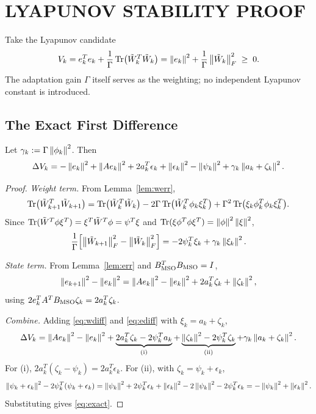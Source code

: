 \section{LYAPUNOV STABILITY PROOF}
\label{sec:proof}

Take the Lyapunov candidate
\begin{equation}\label{eq:V}
V_k=e_k^Te_k+\frac{1}{\Gamma}\operatorname{Tr}\bigl(\tilde{W}_k^T\tilde{W}_k\bigr)
   =\left\lVert e_k \right\rVert^2+\frac{1}{\Gamma}\left\lVert \tilde{W}_k \right\rVert_F^2\;\ge\;0 .
\end{equation}
The adaptation gain $\Gamma$ itself serves as the weighting; no independent
Lyapunov constant is introduced.

\subsection{The Exact First Difference}

\begin{proposition}\label{prop:exact}
Let $\gamma_k:=\Gamma\left\lVert \phi_k \right\rVert^2$. Then
\begin{equation}\label{eq:exact}
\Delta V_k=-\left\lVert e_k \right\rVert^2
+\left\lVert Ae_k \right\rVert^2+2a_k^T\epsilon_k+\left\lVert \epsilon_k \right\rVert^2
-\left\lVert \psi_k \right\rVert^2
+\gamma_k\left\lVert a_k+\zeta_k \right\rVert^2 .
\end{equation}
\end{proposition}

\begin{proof}
\emph{Weight term.} From Lemma~\ref{lem:werr},
\[
\operatorname{Tr}\bigl(\tilde{W}_{k+1}^T\tilde{W}_{k+1}\bigr)
=\operatorname{Tr}\bigl(\tilde{W}_k^T\tilde{W}_k\bigr)
-2\Gamma\operatorname{Tr}\bigl(\tilde{W}_k^T\phi_k\xi_k^T\bigr)
+\Gamma^2\operatorname{Tr}\bigl(\xi_k\phi_k^T\phi_k\xi_k^T\bigr).
\]
Since $\operatorname{Tr}(\tilde{W}^T\phi\xi^T)=\xi^T\tilde{W}^T\phi=\psi^T\xi$ and
$\operatorname{Tr}(\xi\phi^T\phi\xi^T)=\left\lVert \phi \right\rVert^2\left\lVert \xi \right\rVert^2$,
\begin{equation}\label{eq:wdiff}
\frac{1}{\Gamma}\Bigl[\left\lVert \tilde{W}_{k+1} \right\rVert_F^2-\left\lVert \tilde{W}_k \right\rVert_F^2\Bigr]
=-2\psi_k^T\xi_k+\gamma_k\left\lVert \xi_k \right\rVert^2 .
\end{equation}

\emph{State term.} From Lemma~\ref{lem:err} and $B_{\mathrm{MSO}}^TB_{\mathrm{MSO}}=I$,
\begin{equation}\label{eq:ediff}
\left\lVert e_{k+1} \right\rVert^2-\left\lVert e_k \right\rVert^2
=\left\lVert Ae_k \right\rVert^2-\left\lVert e_k \right\rVert^2+2a_k^T\zeta_k+\left\lVert \zeta_k \right\rVert^2,
\end{equation}
using $2e_k^TA^TB_{\mathrm{MSO}}\zeta_k=2a_k^T\zeta_k$.

\emph{Combine.} Adding \eqref{eq:wdiff} and \eqref{eq:ediff} with
$\xi_k=a_k+\zeta_k$,
\[
\Delta V_k=\left\lVert Ae_k \right\rVert^2-\left\lVert e_k \right\rVert^2
+\underbrace{2a_k^T\zeta_k-2\psi_k^Ta_k}_{\text{(i)}}
+\underbrace{\left\lVert \zeta_k \right\rVert^2-2\psi_k^T\zeta_k}_{\text{(ii)}}
+\gamma_k\left\lVert a_k+\zeta_k \right\rVert^2 .
\]
For (i), $2a_k^T(\zeta_k-\psi_k)=2a_k^T\epsilon_k$. For (ii), with
$\zeta_k=\psi_k+\epsilon_k$,
\[
\left\lVert \psi_k+\epsilon_k \right\rVert^2-2\psi_k^T(\psi_k+\epsilon_k)
=\left\lVert \psi_k \right\rVert^2+2\psi_k^T\epsilon_k+\left\lVert \epsilon_k \right\rVert^2
-2\left\lVert \psi_k \right\rVert^2-2\psi_k^T\epsilon_k
=-\left\lVert \psi_k \right\rVert^2+\left\lVert \epsilon_k \right\rVert^2 .
\]
Substituting gives \eqref{eq:exact}.
\end{proof}

